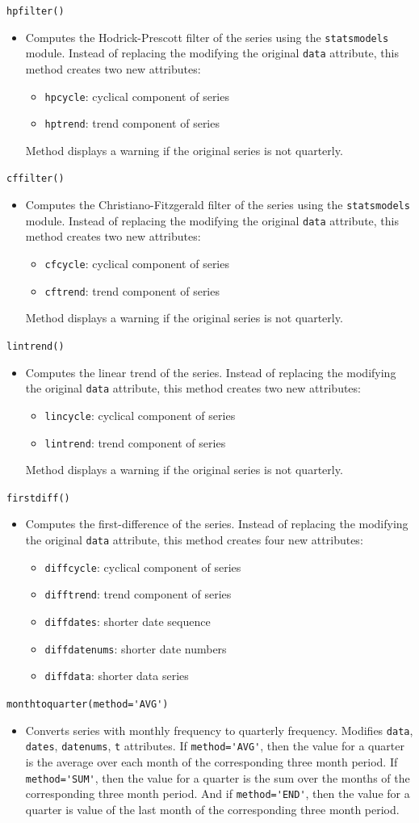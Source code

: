 \documentclass[11pt,fleqn]{article}
\newcommand{\IZ}{\begin{itemize}}
\newcommand{\ZI}{\end{itemize}}
\newcommand{\itemb}{\item[]}
\newcommand{\ttt}{\texttt}
\begin{document}
	\itemb \ttt{hpfilter()}
		\IZ
		\itemb Computes the Hodrick-Prescott filter of the series using the \ttt{statsmodels} module. Instead of replacing the modifying the original \ttt{data} attribute, this method creates two new attributes:
			\IZ
            \itemb \ttt{hpcycle}: cyclical component of series
            \itemb \ttt{hptrend}: trend component of series
            \ZI
		Method displays a warning if the original series is not quarterly.
        \ZI
		
	\itemb \ttt{cffilter()}
		\IZ
		\itemb Computes the Christiano-Fitzgerald filter of the series using the \ttt{statsmodels} module. Instead of replacing the modifying the original \ttt{data} attribute, this method creates two new attributes:
			\IZ
            \itemb \ttt{cfcycle}: cyclical component of series
            \itemb \ttt{cftrend}: trend component of series
            \ZI
		Method displays a warning if the original series is not quarterly.
        \ZI
	
	\itemb \ttt{lintrend()}
		\IZ
		\itemb Computes the linear trend of the series. Instead of replacing the modifying the original \ttt{data} attribute, this method creates two new attributes:
			\IZ
            \itemb \ttt{lincycle}: cyclical component of series
            \itemb \ttt{lintrend}: trend component of series
            \ZI
		Method displays a warning if the original series is not quarterly.
        \ZI
		
	\itemb \ttt{firstdiff()}
		\IZ
		\itemb Computes the first-difference of the series. Instead of replacing the modifying the original \ttt{data} attribute, this method creates four new attributes:
			\IZ
            \itemb \ttt{diffcycle}: cyclical component of series
            \itemb \ttt{difftrend}: trend component of series
            \itemb \ttt{diffdates}: shorter date sequence
            \itemb \ttt{diffdatenums}: shorter date numbers
            \itemb \ttt{diffdata}: shorter data series
            \ZI
        \ZI
		
	\itemb \verb!monthtoquarter(method='AVG')!
		\IZ
		\itemb Converts series with monthly frequency to quarterly frequency. Modifies \ttt{data}, \ttt{dates}, \ttt{datenums}, \ttt{t} attributes. If \verb!method='AVG'!, then the value for a quarter is the average over each month of the corresponding three month period. If \verb!method='SUM'!, then the value for a quarter is the sum over the months of the corresponding three month period. And if \verb!method='END'!, then the value for a quarter is value of the last  month of the corresponding three month period. 
		\ZI		
		
\end{document}
